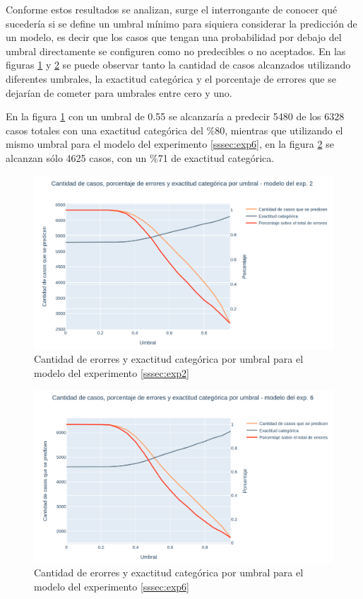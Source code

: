 Conforme estos resultados se analizan, surge el interrongante de conocer qué sucedería si se define un umbral mínimo para siquiera considerar la predicción de un modelo, es decir que los casos que tengan una probabilidad por debajo del umbral directamente se configuren como no predecibles o no aceptados. En las figuras \ref{fig:resultsexp2errorsbythreshold} y \ref{fig:resultsexp6errorsbythreshold} se puede observar tanto la cantidad de casos alcanzados utilizando diferentes umbrales, la exactitud categórica y el porcentaje de errores que se dejarían de cometer para umbrales entre cero y uno. 

En la figura \ref{fig:resultsexp2errorsbythreshold} con un umbral de 0.55 se alcanzaría a predecir 5480 de los 6328 casos totales con una exactitud categórica del \%80, mientras que utilizando el mismo umbral para el modelo del experimento \ref{sssec:exp6}, en la figura \ref{fig:resultsexp6errorsbythreshold} se alcanzan sólo 4625 casos, con un \%71 de exactitud categórica. 

\begin{figure}[h!]
	\centering
	\includegraphics[width=1.1\linewidth]{images/results_exp_2_errors_by_threshold}
	\caption{Cantidad de erorres y exactitud categórica por umbral para el modelo del experimento \ref{sssec:exp2}}
	\label{fig:resultsexp2errorsbythreshold}
\end{figure}

\begin{figure}[h!]
	\centering
	\includegraphics[width=1.1\linewidth]{images/results_exp_6_errors_by_threshold}
	\caption{Cantidad de erorres y exactitud categórica por umbral para el modelo del experimento \ref{sssec:exp6}}
	\label{fig:resultsexp6errorsbythreshold}
\end{figure}

